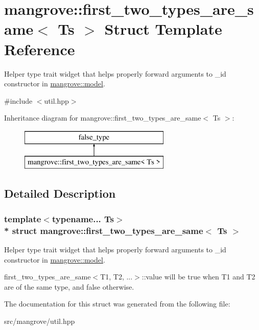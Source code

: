 \hypertarget{structmangrove_1_1first__two__types__are__same}{}\section{mangrove\+:\+:first\+\_\+two\+\_\+types\+\_\+are\+\_\+same$<$ Ts $>$ Struct Template Reference}
\label{structmangrove_1_1first__two__types__are__same}


Helper type trait widget that helps properly forward arguments to \+\_\+id constructor in \hyperlink{classmangrove_1_1model}{mangrove\+::model}.  




{\ttfamily \#include $<$util.\+hpp$>$}

Inheritance diagram for mangrove\+:\+:first\+\_\+two\+\_\+types\+\_\+are\+\_\+same$<$ Ts $>$\+:\begin{figure}[H]
\begin{center}
\leavevmode
\includegraphics[height=2.000000cm]{structmangrove_1_1first__two__types__are__same}
\end{center}
\end{figure}


\subsection{Detailed Description}
\subsubsection*{template$<$typename... Ts$>$\\*
struct mangrove\+::first\+\_\+two\+\_\+types\+\_\+are\+\_\+same$<$ Ts $>$}

Helper type trait widget that helps properly forward arguments to \+\_\+id constructor in \hyperlink{classmangrove_1_1model}{mangrove\+::model}. 

first\+\_\+two\+\_\+types\+\_\+are\+\_\+same$<$\+T1, T2, ...$>$\+::value will be true when T1 and T2 are of the same type, and false otherwise. 

The documentation for this struct was generated from the following file\+:\begin{DoxyCompactItemize}
\item 
src/mangrove/util.\+hpp\end{DoxyCompactItemize}
